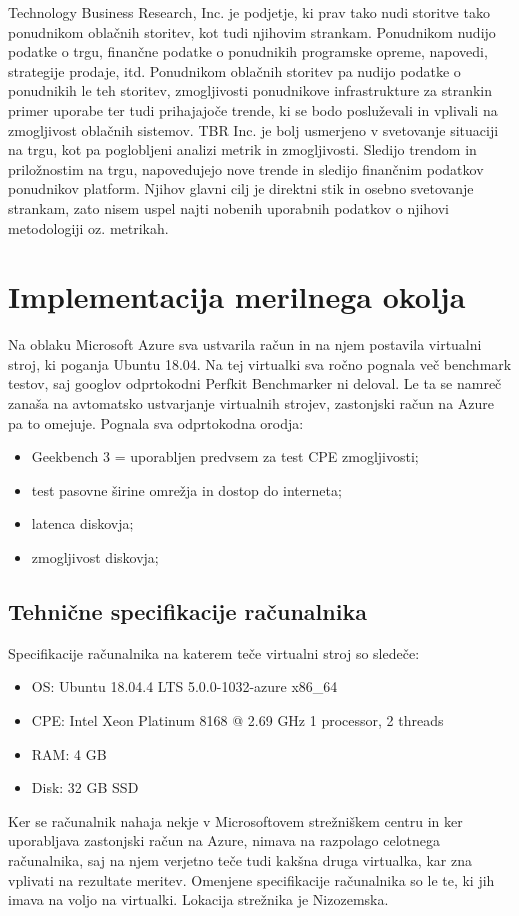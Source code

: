 \cite{TBR} Technology Business Research, Inc. je podjetje, ki prav tako nudi storitve tako ponudnikom oblačnih storitev, kot tudi njihovim strankam. Ponudnikom nudijo podatke o trgu, finančne podatke o ponudnikih programske opreme, napovedi, strategije prodaje, itd. Ponudnikom oblačnih storitev pa nudijo podatke o ponudnikih le teh storitev, zmogljivosti ponudnikove infrastrukture za strankin primer uporabe ter tudi prihajajoče trende, ki se bodo posluževali in vplivali na zmogljivost oblačnih sistemov.
TBR Inc. je bolj usmerjeno v svetovanje situaciji na trgu, kot pa poglobljeni analizi metrik in zmogljivosti. Sledijo trendom in priložnostim na trgu, napovedujejo nove trende in sledijo finančnim podatkov ponudnikov platform. Njihov glavni cilj je direktni stik in osebno svetovanje strankam, zato nisem uspel najti nobenih uporabnih podatkov o njihovi metodologiji oz. metrikah.


\section{Implementacija merilnega okolja}
Na oblaku Microsoft Azure sva ustvarila račun in na njem postavila virtualni stroj, ki poganja Ubuntu 18.04. Na tej virtualki sva ročno pognala več benchmark testov, saj googlov odprtokodni Perfkit Benchmarker ni deloval. Le ta se namreč zanaša na avtomatsko ustvarjanje virtualnih strojev, zastonjski račun na Azure pa to omejuje. Pognala sva odprtokodna orodja:
\begin{itemize}
\item Geekbench 3 = uporabljen predvsem za test CPE zmogljivosti;
\item  test pasovne širine omrežja in dostop do interneta;
\item  latenca diskovja;
\item  zmogljivost diskovja;
\end{itemize}

\subsection{Tehnične specifikacije računalnika}
Specifikacije računalnika na katerem teče virtualni stroj so sledeče:

\begin{itemize}
\item OS: Ubuntu 18.04.4 LTS 5.0.0-1032-azure x86\_64
\item CPE: Intel Xeon Platinum 8168 @ 2.69 GHz 1 processor, 2 threads
\item RAM: 4 GB
\item Disk: 32 GB SSD
\end{itemize}
Ker se računalnik nahaja nekje v Microsoftovem strežniškem centru in ker uporabljava zastonjski račun na Azure, nimava na razpolago celotnega računalnika, saj na njem verjetno teče tudi kakšna druga virtualka, kar zna vplivati na rezultate meritev. Omenjene specifikacije računalnika so le te, ki jih imava na voljo na virtualki. Lokacija strežnika je Nizozemska.


